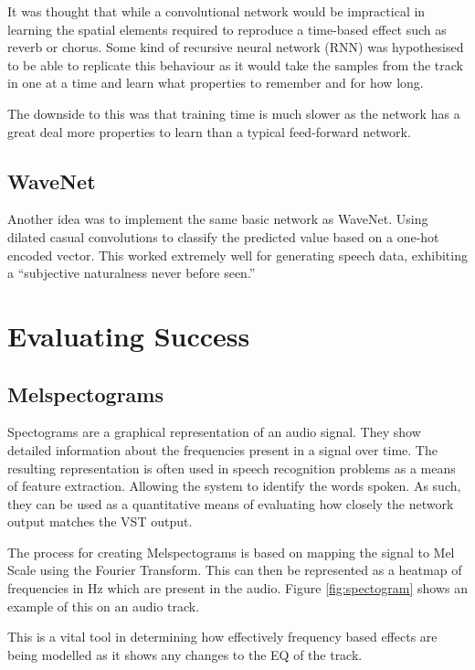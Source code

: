 \documentclass{l4proj}
\begin{document}
It was thought that while a convolutional network would be impractical
in learning the spatial elements required to reproduce a time-based
effect such as reverb or chorus. Some kind of recursive neural network
(RNN) was hypothesised to be able to replicate this behaviour as it
would take the samples from the track in one at a time and learn what
properties to remember and for how long.

The downside to this was that training time is much slower as the
network has a great deal more properties to learn than a typical
feed-forward network.

\hypertarget{wavenet-1}{%
\subsection{WaveNet}\label{wavenet-1}}

Another idea was to implement the same basic network as WaveNet. Using
dilated casual convolutions to classify the predicted value based on a
one-hot encoded vector. This worked extremely well for generating speech
data, exhibiting a ``subjective naturalness never before seen.''

\hypertarget{evaluating-success}{%
\section{Evaluating Success}\label{evaluating-success}}

\hypertarget{melspectograms}{%
\subsection{Melspectograms}\label{melspectograms}}

Spectograms are a graphical representation of an audio signal. They show
detailed information about the frequencies present in a signal over
time. The resulting representation is often used in speech recognition
problems as a means of feature extraction. Allowing the system to
identify the words spoken. As such, they can be used as a quantitative
means of evaluating how closely the network output matches the VST
output.

The process for creating Melspectograms is based on mapping the signal
to Mel Scale using the Fourier Transform. This can then be represented
as a heatmap of frequencies in Hz which are present in the audio. Figure
\ref{fig:spectogram} shows an example of this on an audio track.

This is a vital tool in determining how effectively frequency based
effects are being modelled as it shows any changes to the EQ of the
track.
\end{document}
